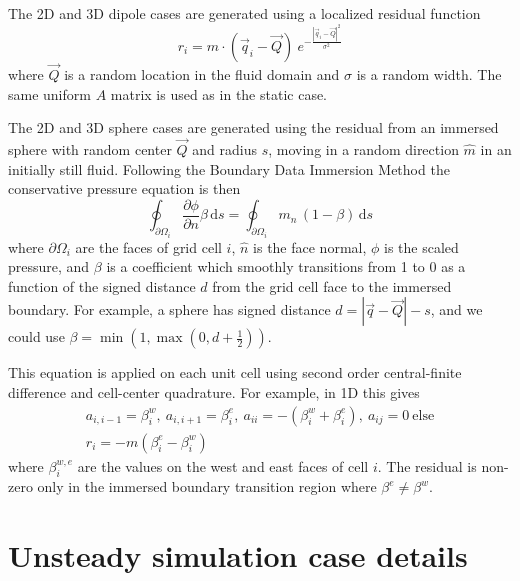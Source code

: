 \documentclass[]{elsarticle}
\begin{document}
The 2D and 3D dipole cases are generated using a localized residual function
$$ r_i = \hat m \cdot \left(\vec q_i-\vec Q\right)\ e^{-\frac{|\vec q_i-\vec Q|^2}{\sigma^2 }} $$
where $\vec Q$ is a random location in the fluid domain and $\sigma$ is a random width. The same uniform $A$ matrix is used as in the static case.

The 2D and 3D sphere cases are generated using the residual from an immersed sphere with random center $\vec Q$ and radius $s$, moving in a random direction $\hat m$ in an initially still fluid. Following the Boundary Data Immersion Method \cite{maertens2015accurate,Lauber2022} the conservative  pressure equation is then
$$ \oint_{\partial\Omega_i} \frac{\partial \phi}{\partial n}\beta \,\text{d}s = \oint_{\partial\Omega_i} m_n \,(1-\beta)  \,\text{d}s $$
where $\partial\Omega_i$ are the faces of grid cell $i$, $\hat n$ is the face normal, $\phi$ is the scaled pressure, and $\beta$ is a coefficient which smoothly transitions from 1 to 0 as a function of the signed distance $d$ from the grid cell face to the immersed boundary. For example, a sphere has signed distance $d=|\vec q-\vec Q|-s$, and we could use $\beta=\min(1,\max(0,d+\frac 1 2))$.

This equation is applied on each unit cell using second order central-finite difference and cell-center quadrature. For example, in 1D this gives
\begin{gather*}
a_{i,i-1}=\beta^w_i,\ a_{i,i+1}=\beta^e_i ,\ a_{ii}=-(\beta^w_i+\beta^e_i),\ a_{ij}=0\ \text{else}\\
r_i =  -m\left(\beta^e_i-\beta^w_i\right)
\end{gather*}
where $\beta^{w,e}_i$ are the values on the west and east faces of cell $i$. The residual is non-zero only in the immersed boundary transition region where $\beta^e\ne\beta^w$.

\section{Unsteady simulation case details}\label{app flow}
\end{document}
